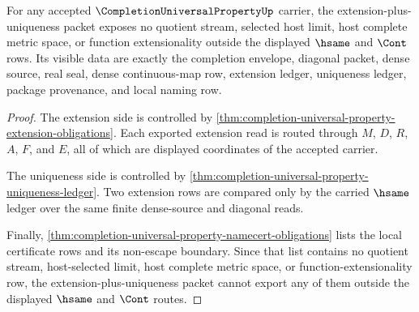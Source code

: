\begin{theorem}
\label{thm:completion-universal-property-extension-non-escape}
For any accepted $\CompletionUniversalPropertyUp$ carrier, the extension-plus-uniqueness packet exposes no quotient stream, selected host limit, host complete metric space, or function extensionality outside the displayed $\hsame$ and $\Cont$ rows. Its visible data are exactly the completion envelope, diagonal packet, dense source, real seal, dense continuous-map row, extension ledger, uniqueness ledger, package provenance, and local naming row.
\end{theorem}
\begin{proof}
The extension side is controlled by \autoref{thm:completion-universal-property-extension-obligations}. Each exported extension read is routed through $M$, $D$, $R$, $A$, $F$, and $E$, all of which are displayed coordinates of the accepted carrier.

The uniqueness side is controlled by \autoref{thm:completion-universal-property-uniqueness-ledger}. Two extension rows are compared only by the carried $\hsame$ ledger over the same finite dense-source and diagonal reads.

Finally, \autoref{thm:completion-universal-property-namecert-obligations} lists the local certificate rows and its non-escape boundary. Since that list contains no quotient stream, host-selected limit, host complete metric space, or function-extensionality row, the extension-plus-uniqueness packet cannot export any of them outside the displayed $\hsame$ and $\Cont$ routes.
\end{proof}

